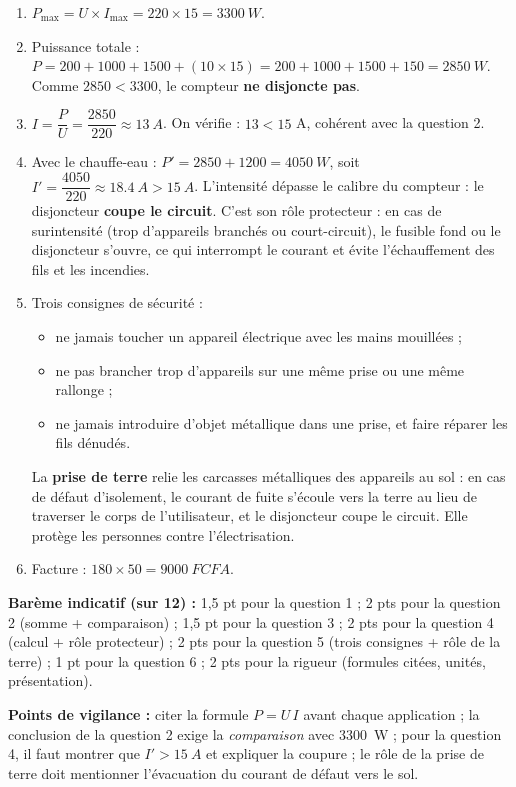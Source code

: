 \documentclass[11pt]{article}
\begin{document}
\begin{corrige}
\begin{enumerate}
\item $P_{\max} = U \times I_{\max} = 220 \times 15 = \SI{3300}{W}$.
\item Puissance totale : $P = 200 + 1000 + 1500 + (10 \times 15) = 200 + 1000 + 1500 + 150 = \SI{2850}{W}$.
Comme $2850 < 3300$, le compteur \textbf{ne disjoncte pas}.
\item $I = \dfrac{P}{U} = \dfrac{2850}{220} \approx \SI{13}{A}$. On vérifie : $13 < 15$ A, cohérent avec la question 2.
\item Avec le chauffe-eau : $P' = 2850 + 1200 = \SI{4050}{W}$, soit $I' = \dfrac{4050}{220} \approx \SI{18,4}{A} > \SI{15}{A}$. L'intensité dépasse le calibre du compteur : le disjoncteur \textbf{coupe le circuit}. C'est son rôle protecteur : en cas de surintensité (trop d'appareils branchés ou court-circuit), le fusible fond ou le disjoncteur s'ouvre, ce qui interrompt le courant et évite l'échauffement des fils et les incendies.
\item Trois consignes de sécurité :
\begin{itemize}
\item ne jamais toucher un appareil électrique avec les mains mouillées ;
\item ne pas brancher trop d'appareils sur une même prise ou une même rallonge ;
\item ne jamais introduire d'objet métallique dans une prise, et faire réparer les fils dénudés.
\end{itemize}
La \textbf{prise de terre} relie les carcasses métalliques des appareils au sol : en cas de défaut d'isolement, le courant de fuite s'écoule vers la terre au lieu de traverser le corps de l'utilisateur, et le disjoncteur coupe le circuit. Elle protège les personnes contre l'électrisation.
\item Facture : $180 \times 50 = \SI{9000}{FCFA}$.
\end{enumerate}
\textbf{Barème indicatif (sur 12) :} 1,5 pt pour la question 1 ; 2 pts pour la question 2 (somme + comparaison) ; 1,5 pt pour la question 3 ; 2 pts pour la question 4 (calcul + rôle protecteur) ; 2 pts pour la question 5 (trois consignes + rôle de la terre) ; 1 pt pour la question 6 ; 2 pts pour la rigueur (formules citées, unités, présentation).

\textbf{Points de vigilance :} citer la formule $P = U\,I$ avant chaque application ; la conclusion de la question 2 exige la \emph{comparaison} avec \SI{3300}{W} ; pour la question 4, il faut montrer que $I' > \SI{15}{A}$ et expliquer la coupure ; le rôle de la prise de terre doit mentionner l'évacuation du courant de défaut vers le sol.
\end{corrige}
\end{document}
